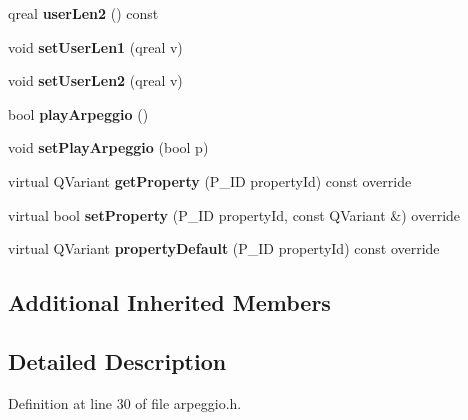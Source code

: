 \begin{DoxyCompactItemize}
\item 
\mbox{\label{class_ms_1_1_arpeggio_a922dd469449e6d7689af5480c31d8c91}} 
qreal {\bfseries user\+Len2} () const
\item 
\mbox{\label{class_ms_1_1_arpeggio_a9d174e7d92b4356f3e5e9a5d9ade9ec4}} 
void {\bfseries set\+User\+Len1} (qreal v)
\item 
\mbox{\label{class_ms_1_1_arpeggio_aeaa8c97b7e840fb5ccd75f027c877c47}} 
void {\bfseries set\+User\+Len2} (qreal v)
\item 
\mbox{\label{class_ms_1_1_arpeggio_aeafe22ee607e883d01a95ea579f54e12}} 
bool {\bfseries play\+Arpeggio} ()
\item 
\mbox{\label{class_ms_1_1_arpeggio_ad451d65e0a3f70d8e5b5c34f0a86f440}} 
void {\bfseries set\+Play\+Arpeggio} (bool p)
\item 
\mbox{\label{class_ms_1_1_arpeggio_add04ec436506b225ef627c6b556eb4d1}} 
virtual Q\+Variant {\bfseries get\+Property} (P\+\_\+\+ID property\+Id) const override
\item 
\mbox{\label{class_ms_1_1_arpeggio_a45fca1673cd19e4f6983af3e4d3bd3d2}} 
virtual bool {\bfseries set\+Property} (P\+\_\+\+ID property\+Id, const Q\+Variant \&) override
\item 
\mbox{\label{class_ms_1_1_arpeggio_a22a261e2b4add17d6419032161958fbd}} 
virtual Q\+Variant {\bfseries property\+Default} (P\+\_\+\+ID property\+Id) const override
\end{DoxyCompactItemize}
\subsection*{Additional Inherited Members}


\subsection{Detailed Description}


Definition at line 30 of file arpeggio.\+h.




